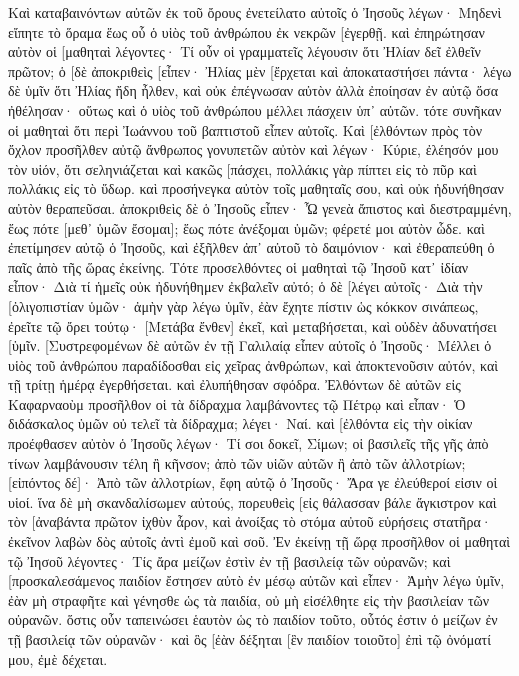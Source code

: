 Καὶ καταβαινόντων αὐτῶν ἐκ τοῦ ὄρους ἐνετείλατο αὐτοῖς ὁ Ἰησοῦς λέγων· Μηδενὶ εἴπητε τὸ ὅραμα ἕως οὗ ὁ υἱὸς τοῦ ἀνθρώπου ἐκ νεκρῶν [ἐγερθῇ. 
καὶ ἐπηρώτησαν αὐτὸν οἱ [μαθηταὶ λέγοντες· Τί οὖν οἱ γραμματεῖς λέγουσιν ὅτι Ἠλίαν δεῖ ἐλθεῖν πρῶτον; 
ὁ [δὲ ἀποκριθεὶς [εἶπεν· Ἠλίας μὲν [ἔρχεται καὶ ἀποκαταστήσει πάντα· 
λέγω δὲ ὑμῖν ὅτι Ἠλίας ἤδη ἦλθεν, καὶ οὐκ ἐπέγνωσαν αὐτὸν ἀλλὰ ἐποίησαν ἐν αὐτῷ ὅσα ἠθέλησαν· οὕτως καὶ ὁ υἱὸς τοῦ ἀνθρώπου μέλλει πάσχειν ὑπ᾽ αὐτῶν. 
τότε συνῆκαν οἱ μαθηταὶ ὅτι περὶ Ἰωάννου τοῦ βαπτιστοῦ εἶπεν αὐτοῖς. 
Καὶ [ἐλθόντων πρὸς τὸν ὄχλον προσῆλθεν αὐτῷ ἄνθρωπος γονυπετῶν αὐτὸν 
καὶ λέγων· Κύριε, ἐλέησόν μου τὸν υἱόν, ὅτι σεληνιάζεται καὶ κακῶς [πάσχει, πολλάκις γὰρ πίπτει εἰς τὸ πῦρ καὶ πολλάκις εἰς τὸ ὕδωρ. 
καὶ προσήνεγκα αὐτὸν τοῖς μαθηταῖς σου, καὶ οὐκ ἠδυνήθησαν αὐτὸν θεραπεῦσαι. 
ἀποκριθεὶς δὲ ὁ Ἰησοῦς εἶπεν· Ὦ γενεὰ ἄπιστος καὶ διεστραμμένη, ἕως πότε [μεθ᾽ ὑμῶν ἔσομαι]; ἕως πότε ἀνέξομαι ὑμῶν; φέρετέ μοι αὐτὸν ὧδε. 
καὶ ἐπετίμησεν αὐτῷ ὁ Ἰησοῦς, καὶ ἐξῆλθεν ἀπ᾽ αὐτοῦ τὸ δαιμόνιον· καὶ ἐθεραπεύθη ὁ παῖς ἀπὸ τῆς ὥρας ἐκείνης. 
Τότε προσελθόντες οἱ μαθηταὶ τῷ Ἰησοῦ κατ᾽ ἰδίαν εἶπον· Διὰ τί ἡμεῖς οὐκ ἠδυνήθημεν ἐκβαλεῖν αὐτό; 
ὁ δὲ [λέγει αὐτοῖς· Διὰ τὴν [ὀλιγοπιστίαν ὑμῶν· ἀμὴν γὰρ λέγω ὑμῖν, ἐὰν ἔχητε πίστιν ὡς κόκκον σινάπεως, ἐρεῖτε τῷ ὄρει τούτῳ· [Μετάβα ἔνθεν] ἐκεῖ, καὶ μεταβήσεται, καὶ οὐδὲν ἀδυνατήσει [ὑμῖν. 
[Συστρεφομένων δὲ αὐτῶν ἐν τῇ Γαλιλαίᾳ εἶπεν αὐτοῖς ὁ Ἰησοῦς· Μέλλει ὁ υἱὸς τοῦ ἀνθρώπου παραδίδοσθαι εἰς χεῖρας ἀνθρώπων, 
καὶ ἀποκτενοῦσιν αὐτόν, καὶ τῇ τρίτῃ ἡμέρᾳ ἐγερθήσεται. καὶ ἐλυπήθησαν σφόδρα. 
Ἐλθόντων δὲ αὐτῶν εἰς Καφαρναοὺμ προσῆλθον οἱ τὰ δίδραχμα λαμβάνοντες τῷ Πέτρῳ καὶ εἶπαν· Ὁ διδάσκαλος ὑμῶν οὐ τελεῖ τὰ δίδραχμα; 
λέγει· Ναί. καὶ [ἐλθόντα εἰς τὴν οἰκίαν προέφθασεν αὐτὸν ὁ Ἰησοῦς λέγων· Τί σοι δοκεῖ, Σίμων; οἱ βασιλεῖς τῆς γῆς ἀπὸ τίνων λαμβάνουσιν τέλη ἢ κῆνσον; ἀπὸ τῶν υἱῶν αὐτῶν ἢ ἀπὸ τῶν ἀλλοτρίων; 
[εἰπόντος δέ]· Ἀπὸ τῶν ἀλλοτρίων, ἔφη αὐτῷ ὁ Ἰησοῦς· Ἄρα γε ἐλεύθεροί εἰσιν οἱ υἱοί. 
ἵνα δὲ μὴ σκανδαλίσωμεν αὐτούς, πορευθεὶς [εἰς θάλασσαν βάλε ἄγκιστρον καὶ τὸν [ἀναβάντα πρῶτον ἰχθὺν ἆρον, καὶ ἀνοίξας τὸ στόμα αὐτοῦ εὑρήσεις στατῆρα· ἐκεῖνον λαβὼν δὸς αὐτοῖς ἀντὶ ἐμοῦ καὶ σοῦ. 
Ἐν ἐκείνῃ τῇ ὥρᾳ προσῆλθον οἱ μαθηταὶ τῷ Ἰησοῦ λέγοντες· Τίς ἄρα μείζων ἐστὶν ἐν τῇ βασιλείᾳ τῶν οὐρανῶν; 
καὶ [προσκαλεσάμενος παιδίον ἔστησεν αὐτὸ ἐν μέσῳ αὐτῶν 
καὶ εἶπεν· Ἀμὴν λέγω ὑμῖν, ἐὰν μὴ στραφῆτε καὶ γένησθε ὡς τὰ παιδία, οὐ μὴ εἰσέλθητε εἰς τὴν βασιλείαν τῶν οὐρανῶν. 
ὅστις οὖν ταπεινώσει ἑαυτὸν ὡς τὸ παιδίον τοῦτο, οὗτός ἐστιν ὁ μείζων ἐν τῇ βασιλείᾳ τῶν οὐρανῶν· 
καὶ ὃς [ἐὰν δέξηται [ἓν παιδίον τοιοῦτο] ἐπὶ τῷ ὀνόματί μου, ἐμὲ δέχεται. 
